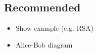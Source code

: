 
\subsection{Recommended}
\begin{itemize}
\item Show example (e.g. RSA)
\item Alice-Bob diagram
\end{itemize}
